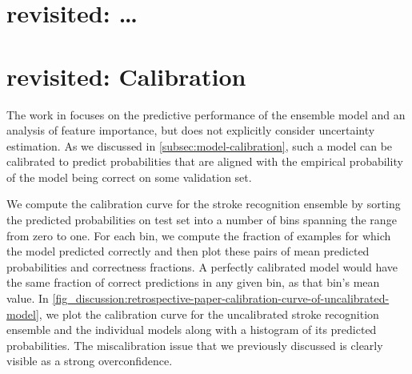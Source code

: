 \section{ revisited: \dots} \label{sec:discussion-paper-review}



\section{ revisited: Calibration}
The work in \textcite{wenstrup_retrospective_2023} focuses on the predictive performance of the ensemble model and an analysis of feature importance, but does not explicitly consider uncertainty estimation. 
As we discussed in \cref{subsec:model-calibration}, such a model can be calibrated to predict probabilities that are aligned with the empirical probability of the model being correct on some validation set.

We compute the calibration curve for the stroke recognition ensemble by sorting the predicted probabilities on test set into a number of bins spanning the range from zero to one. For each bin, we compute the fraction of examples for which the model predicted correctly and then plot these pairs of mean predicted probabilities and correctness fractions. A perfectly calibrated model would have the same fraction of correct predictions in any given bin, as that bin's mean value. 
In \cref{fig_discussion:retrospective-paper-calibration-curve-of-uncalibrated-model}, we plot the calibration curve for the uncalibrated stroke recognition ensemble and the individual models along with a histogram of its predicted probabilities. The miscalibration issue that we previously discussed is clearly visible as a strong overconfidence. 

